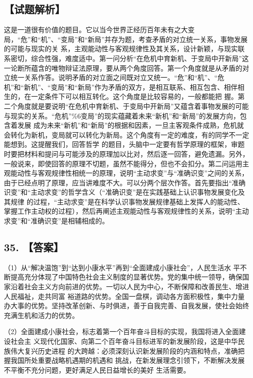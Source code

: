 \documentclass[UTF8,11pt]{ctexart}
\begin{document}
\subsection*{【试题解析】}

这是一道很有价值的题目。它以当今世界正经历百年未有之大变局，“危”和“机”、“变局”和“新局”并存为题，考查矛盾的对立统一关系，事物发展的可能与现实的关 系，主观能动性与客观规律性及其关系，设计新颖，与现实联系密切，综合性强，难度适中。第一问分析“在危机中育新机、于变局中开新局”这一论断所蕴含的唯物辩证法原理，要从两个角度回答。第一个角度就是从矛盾的对立统一关系作答。说明矛盾的对立面之间既对立又统一。“危”和“机”、“危机”和“新机”、“变局”和“新局”作为矛盾的双方，是相互联系、相互包含、相伴相生的，在一定条件下可以相互转化。这个角度是比较容易的，一般都能把 握。第二个角度就是要说明“在危机中育新机、于变局中开新局”又蕴含着事物发展的可能与现实的关系。“危机”\%6变局”的现实蕴藏着未来“新机”和“新局”的发展方向，包含着发展 成为未来“新机”和“新局”的根据和因素，一旦主客观条件成熟，危机就会转化为新机，变局就可以转化为新局。这个角度有一定的难度，有的同学不一定能想到。这提醒我们，回答哲学 的题目，头脑中一定要有哲学原理的框架，审题时要把材料和提问与可能涉及的原理加以比对，然后逐一回答，避免遗漏。另外，一般说来，即使回答的原理不切题，虽然不能得分，但也不会扣分。第二问运用主观能动性与客观规律性相统一的原理，说明“主动求变”与“准确识变”之间的关系，由于已经点明了原理，应当讲难度不大。可以分两个层次作答。首先要指出“准确 识变”和“主动求变”的哲学含义（“准确识变”是在实践基础上认识事物发展变化及其规律 的过程，“主动求变”是在科学认识事物发展规律基础上发挥人的能动性、掌握工作主动权的过程），然后再阐述主观能动性与客观规律性的关系，说明“主动求变”和“准确识变”是相辅相成的。


\subsection*{35. 【答案】}

（1）从“解决温饱”到“达到小康水平”再到“全面建成小康社会”，人民生活水 平不断提高充分体现了中国特色社会主义制度的显著优势。党的集中统一领导，确保国家沿着社会主义方向前进的优势。一切以人民为中心，不断保障和改善民生、增进人民福祉，走共同富 裕道路的优势。全国一盘棋，调动各方面积极性，集中力量办大事的优势。坚持改革创新、与时俱进，善于自我完善、自我发展，使社会始终充满生机和活力的优势。


（2）全面建成小康社会，标志着第一个百年奋斗目标的实现，我国将进入全面建设社会主 义现代化国家、向第二个百年奋斗目标进军的新发展阶段，这是中华民族伟大复兴历史进程 的大跨越：必须深刻认识新发展阶段的内涵和特点，准确把握我国所处重要战略机遇期的机遇和 挑战，在新发展理念引领下，不断解决发展不平衡不充分问题，更好满足人民日益增长的美好 生活需要。
\end{document}
